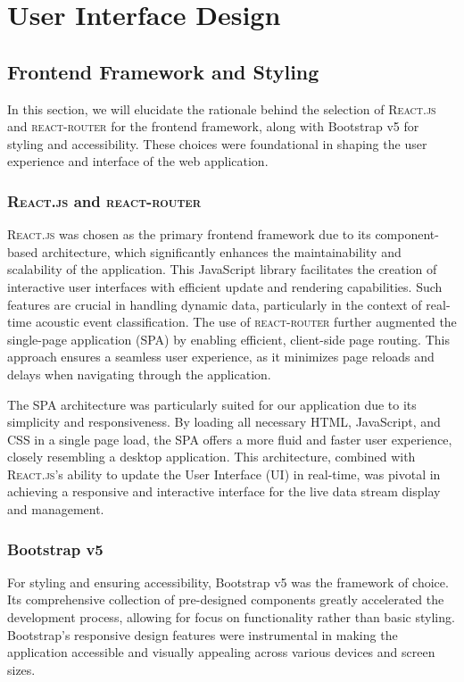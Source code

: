 \section{User Interface Design}



\subsection{Frontend Framework and Styling}
In this section, we will elucidate the rationale behind the selection of \textsc{React.js} and \textsc{react-router} for the frontend framework, along with Bootstrap v5 for styling and accessibility. These choices were foundational in shaping the user experience and interface of the web application.

\subsubsection{\textsc{React.js} and \textsc{react-router}}
\textsc{React.js} was chosen as the primary frontend framework due to its component-based architecture, which significantly enhances the maintainability and scalability of the application. This JavaScript library facilitates the creation of interactive user interfaces with efficient update and rendering capabilities. Such features are crucial in handling dynamic data, particularly in the context of real-time acoustic event classification. The use of \textsc{react-router} further augmented the single-page application (SPA) by enabling efficient, client-side page routing. This approach ensures a seamless user experience, as it minimizes page reloads and delays when navigating through the application.

The SPA architecture was particularly suited for our application due to its simplicity and responsiveness. By loading all necessary HTML, JavaScript, and CSS in a single page load, the SPA offers a more fluid and faster user experience, closely resembling a desktop application. This architecture, combined with \textsc{React.js}'s ability to update the User Interface (UI) in real-time, was pivotal in achieving a responsive and interactive interface for the live data stream display and management.

\subsubsection{Bootstrap v5}
For styling and ensuring accessibility, Bootstrap v5 was the framework of choice. Its comprehensive collection of pre-designed components greatly accelerated the development process, allowing for focus on functionality rather than basic styling. Bootstrap’s responsive design features were instrumental in making the application accessible and visually appealing across various devices and screen sizes.


